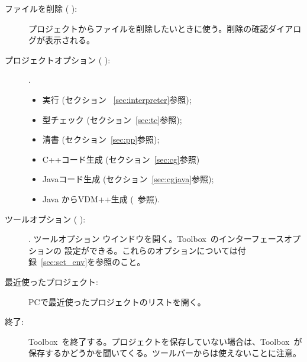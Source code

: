 \documentclass[\pformat,12pt]{jarticle}
\newcommand{\Toolbox}{Toolbox}
\newcommand{\guicmd}[1]{{\gt #1}}
\begin{document}
\begin{description}
\item[\guicmd{ファイルを削除} (\hspace{-1.5mm}
 ):]
 プロジェクトからファイルを削除したいときに使う。削除の確認ダイアログが表示される。

\item[\guicmd{プロジェクトオプション} (\hspace{-1.5mm}
):].
  \begin{itemize}
    \item \guicmd{実行} (セクション ~\ref{sec:interpreter}参照);
    \item \guicmd{型チェック}  (セクション~\ref{sec:tc}参照);
    \item \guicmd{清書}  (セクション~\ref{sec:pp}参照);
    \item \guicmd{C++コード生成} (セクション~\ref{sec:cg}参照)

    \item \guicmd{Javaコード生成}  (セクション~\ref{sec:cgjava}参照);
    \item \guicmd{Java からVDM++生成}  (~\cite{Java2VDMMan-SCSK}参照). 
  \end{itemize}

\item[\guicmd{ツールオプション} (\hspace{-1.5mm}
):].
  \guicmd{ツールオプション} ウインドウを開く。\Toolbox\ のインターフェースオプションの
  設定ができる。これらのオプションについては付録~\ref{sec:set_env}を参照のこと。

\item[\guicmd{最近使ったプロジェクト}:]
  PCで最近使ったプロジェクトのリストを開く。

\item[\guicmd{終了}:]
  \Toolbox\ を終了する。プロジェクトを保存していない場合は、\Toolbox\ が
  保存するかどうかを聞いてくる。ツールバーからは使えないことに注意。

\end{description}
\end{document}
